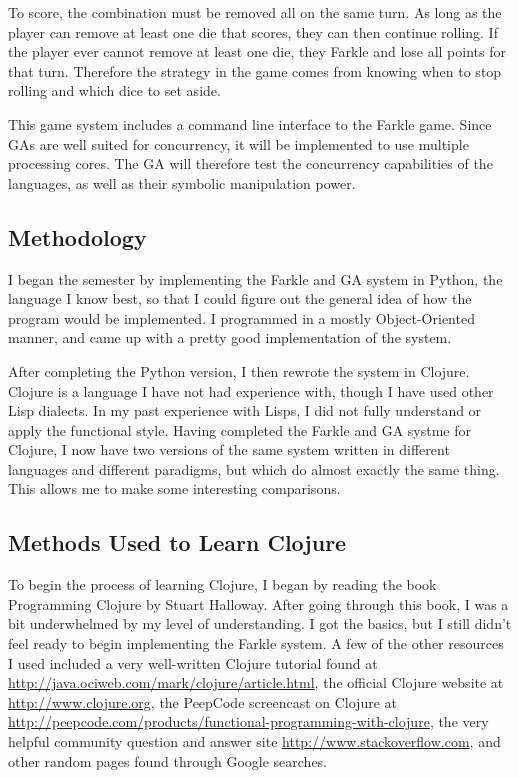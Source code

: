 \documentclass{article}
\begin{document}
To score, the combination must be removed all on the same turn.  As long as the
player can remove at least one die that scores, they can then continue rolling.
If the player ever cannot remove at least one die, they Farkle and lose all
points for that turn.  Therefore the strategy in the game comes from knowing
when to stop rolling and which dice to set aside.

This game system includes a command line interface to the Farkle game.  Since
GAs are well suited for concurrency, it will be implemented to use multiple
processing cores.  The GA will therefore test the concurrency capabilities of
the languages, as well as their symbolic manipulation power.

\subsection{Methodology}

I began the semester by implementing the Farkle and GA system in Python, the language I know best, so that I could figure out the general idea of how the program would be implemented.  I programmed in a mostly Object-Oriented manner, and came up with a pretty good implementation of the system.  

After completing the Python version, I then rewrote the system in Clojure.  Clojure is a language I have not had experience with, though I have used other Lisp dialects.  In my past experience with Lisps, I did not fully understand or apply the functional style.  Having completed the Farkle and GA systme for Clojure, I now have two versions of the same system written in different languages and different paradigms, but which do almost exactly the same thing.  This allows me to make some interesting comparisons.

\subsection{Methods Used to Learn Clojure}

To begin the process of learning Clojure, I began by reading the book Programming Clojure by Stuart Halloway.  After going through this book, I was a bit underwhelmed by my level of understanding.  I got the basics, but I still didn't feel ready to begin implementing the Farkle system.  A few of the other resources I used included a very well-written Clojure tutorial found at \url{http://java.ociweb.com/mark/clojure/article.html}, the official Clojure website at \url{http://www.clojure.org}, the PeepCode screencast on Clojure at \url{http://peepcode.com/products/functional-programming-with-clojure}, the very helpful community question and answer site \url{http://www.stackoverflow.com}, and other random pages found through Google searches.
\end{document}
